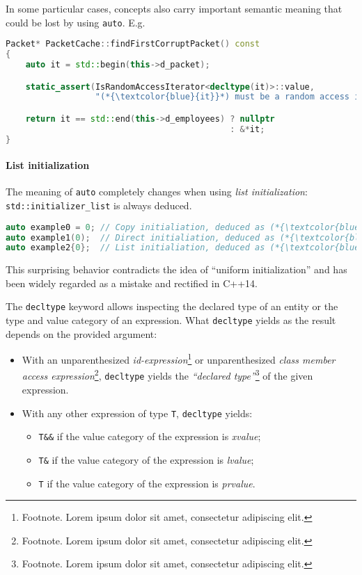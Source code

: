 \documentclass[twoside,10pt,letterpaper,usenames]{newstyle-PearsonGeneric-7-38}
\begin{document}
In some particular cases, concepts also carry important semantic meaning
that could be lost by using \texttt{auto}. E.g.

\begin{lstlisting}[language=C++]
Packet* PacketCache::findFirstCorruptPacket() const
{
    auto it = std::begin(this->d_packet);

    static_assert(IsRandomAccessIterator<decltype(it)>::value,
                  "(*{\textcolor{blue}{it}}*) must be a random access iterator.");

    return it == std::end(this->d_employees) ? nullptr
                                             : &*it;
}
\end{lstlisting}
    

\paragraph[List initialization]{List initialization}\label{list-initialization}

The meaning of \texttt{auto} completely changes when using \emph{list
initialization}: \texttt{std::initializer\_list} is always deduced.

\begin{lstlisting}[language=C++]
auto example0 = 0; // Copy initialiation, deduced as (*{\textcolor{blue}{int}}*).
auto example1(0);  // Direct initialiation, deduced as (*{\textcolor{blue}{int}}*).
auto example2{0};  // List initialiation, deduced as (*{\textcolor{blue}{std::initializer\_list<int>}}*).
\end{lstlisting}
    

This surprising behavior contradicts the idea of ``uniform
initialization'' and has been widely regarded as a mistake and rectified
in C++14.

The \texttt{decltype} keyword allows inspecting the declared type of an
entity or the type and value category of an expression. What
\texttt{decltype} yields as the result depends on the provided argument:

\begin{itemize}
\item{With an unparenthesized \emph{id-expression}\cprotect\footnote{Footnote. Lorem ipsum dolor sit amet, consectetur adipiscing elit.} or unparenthesized \emph{class member access expression}\cprotect\footnote{Footnote. Lorem ipsum dolor sit amet, consectetur adipiscing elit.}, \texttt{decltype} yields the \emph{``declared type''}\cprotect\footnote{Footnote. Lorem ipsum dolor sit amet, consectetur adipiscing elit.} of the given expression.}
\item{With any other expression of type \texttt{T}, \texttt{decltype} yields:\begin{itemize}
\item{\texttt{T\&\&} if the value category of the expression is \emph{xvalue};}
\item{\texttt{T\&} if the value category of the expression is \emph{lvalue};}
\item{\texttt{T} if the value category of the expression is \emph{prvalue}.}
\end{itemize}
}
\end{itemize}
\end{document}
